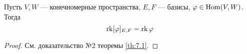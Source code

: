 \documentclass[../main.tex]{subfiles}
\begin{document}
\begin{theorem-non}
  Пусть $V, W$ --- конечномерные пространства, $E, F$ --- базисы, $\varphi \in \operatorname{Hom}(V, W)$. Тогда
  \begin{equation*}
    \operatorname{rk} [\varphi]_{E, F} = \operatorname{rk} \varphi
  \end{equation*}
\end{theorem-non}
\begin{proof}
  См. доказательство №2 теоремы \ref{th:7.1}.
\end{proof}
\end{document}
